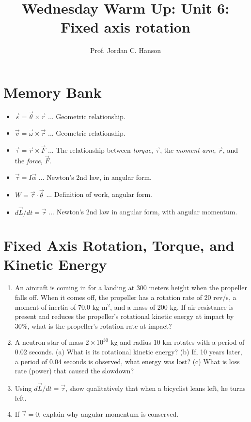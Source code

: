 \documentclass{article}
\begin{document}
\twocolumn

\title{Wednesday Warm Up: Unit 6: Fixed axis rotation}
\author{Prof. Jordan C. Hanson}

\maketitle

\section{Memory Bank}

\begin{itemize}
\item $\vec{s} = \vec{\theta} \times \vec{r}$ ... Geometric relationship.
\item $\vec{v} = \vec{\omega} \times \vec{r}$ ... Geometric relationship.
\item $\vec{\tau} = \vec{r} \times \vec{F}$ ... The relationship between \textit{torque}, $\vec{\tau}$, the \textit{moment arm}, $\vec{r}$, and the \textit{force}, $\vec{F}$.
\item $\vec{\tau} = I \vec{\alpha}$ ... Newton's 2nd law, in angular form.
\item $W = \vec{\tau} \cdot \vec{\theta}$ ... Definition of work, angular form.
\item $d\vec{L}/dt = \vec{\tau}$ ... Newton's 2nd law in angular form, with angular momentum.
\end{itemize}

\section{Fixed Axis Rotation, Torque, and Kinetic Energy}

\begin{enumerate}
\item An aircraft is coming in for a landing at 300 meters height when the propeller falls off. When it comes off, the propeller has a rotation rate of 20 rev/s, a moment of inertia of 70.0 kg m$^2$, and a mass of 200 kg. If air resistance is present and reduces the propeller’s rotational kinetic energy at impact by 30\%, what is the propeller’s rotation rate at impact? \\ \vspace{3cm}
\item A neutron star of mass $2\times 10^{30}$ kg and radius 10 km rotates with a period of 0.02 seconds. (a) What is its rotational kinetic energy? (b) If, 10 years later, a period of 0.04 seconds is observed, what energy was lost? (c) What is loss rate (power) that caused the slowdown? \\ \vspace{3cm}
\item Using $d\vec{L}/dt = \vec{\tau}$, show qualitatively that when a bicyclist leans left, he turns left. \\ \vspace{6cm}
\item If $\vec{\tau} = 0$, explain why angular momentum is conserved.
\end{enumerate}
\end{document}

